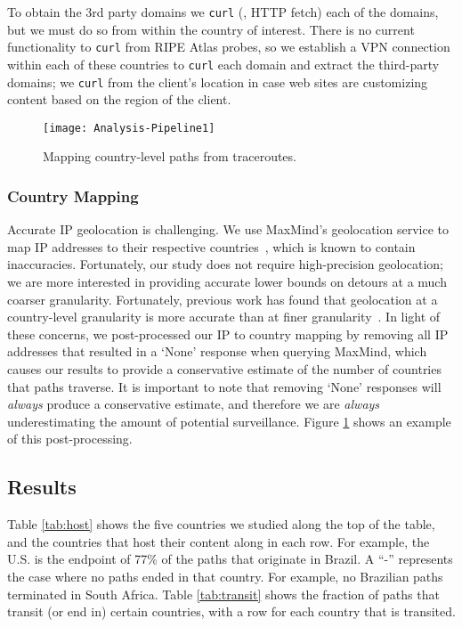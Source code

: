 To obtain the 3rd party
domains we {\tt curl} (\ie, HTTP fetch) each of the domains, but we must
do so from within the country of interest.  There is no current
functionality to {\tt curl} from RIPE Atlas probes, so we establish a
VPN connection within each of these countries to {\tt curl} each domain
and extract the third-party domains; we {\tt curl} from the client's
location in case web sites are customizing content based on the region
of the client. 

\begin{figure}[t]
\centering
\texttt{[image: Analysis-Pipeline1]}
\caption{Mapping country-level paths from traceroutes.}
\label{fig:analysis_pipeline}
\end{figure}


\subsubsection{Country Mapping}
\label{c_map}

Accurate IP geolocation is challenging. We use MaxMind's
geolocation service to map IP addresses to their respective
countries~\cite{maxmind}, which is known to contain inaccuracies.
Fortunately, our study does not require high-precision geolocation; we
are more interested in providing accurate lower bounds on detours at a
much coarser granularity.  Fortunately, previous work has found that
geolocation at a country-level granularity is more accurate than at
finer granularity~\cite{huffaker2011geocompare}.  In light of these
concerns, we post-processed our IP to country mapping
by removing all IP addresses that resulted in a `None' response when
querying MaxMind, which causes our results to provide a conservative
estimate of the number of countries that paths traverse. It is important
to note that removing `None' responses will \textit{always} produce a
conservative estimate, and therefore we are \textit{always}
underestimating the amount of potential surveillance.  
Figure \ref{fig:analysis_pipeline} shows an example of this
post-processing. 

\subsection{Results}



Table \ref{tab:host} shows the five countries we studied along the top
of the table, and the countries that host their content along in each
row.  For example, the U.S. is the endpoint of 77\% of the
paths that originate in Brazil.  A ``-'' represents the case where no
paths ended in that country.  For example, no Brazilian paths terminated in
South Africa. Table \ref{tab:transit} shows the fraction of paths that
transit (or end in) certain countries, with a row for each country that is transited.

